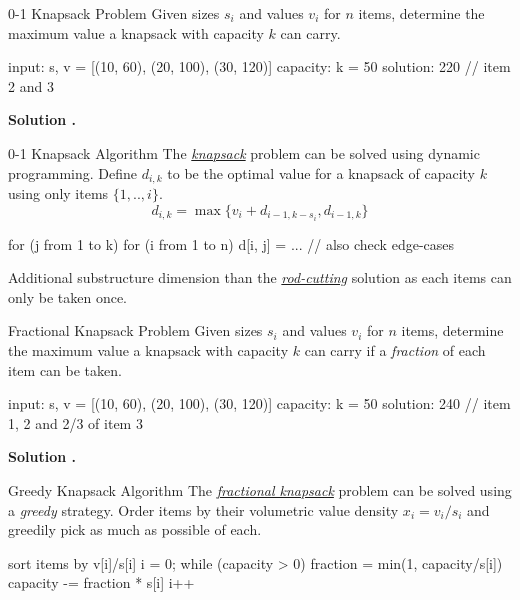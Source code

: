\documentclass{cognito}
\begin{document}
\begin{note}{0-1 Knapsack Problem}
	Given sizes $s_i$ and values $v_i$ for $n$ items, determine the maximum value
	a knapsack with capacity $k$ can carry.
	\begin{largecode}
 input: s, v = [(10, 60), (20, 100), (30, 120)]
 capacity: k = 50
 solution: 220  // item 2 and 3 
	\end{largecode}
	\bf Solution \hyperref[note:0-1 Knapsack Algorithm]{\solutionref}.
\end{note}

\begin{note}{0-1 Knapsack Algorithm}
	The \hyperref[note:0-1 Knapsack Problem]{\it knapsack} problem can be solved using dynamic programming.
	Define $d_{i,k}$ to be the optimal value for a knapsack of capacity $k$ using only items $\{1,..,i\}$.
	$$
		d_{i, k} = \max \{v_i +  d_{i-1, k - s_i}, d_{i-1, k} \}
	$$
	\vspace{-15pt}
	\begin{largecode}
for (j from 1 to k)
	for (i from 1 to n)
		d[i, j] = ...  // also check edge-cases
	\end{largecode}
	\begin{remark} Additional substructure dimension than the \hyperref[note:Rod Cutting Solution]{\it rod-cutting} solution
		as each items can only be taken once.%
	\end{remark} \vspace{-5pt}
\end{note}

\begin{note}{Fractional Knapsack Problem}
	Given sizes $s_i$ and values $v_i$ for $n$ items, determine the maximum value
	a knapsack with capacity $k$ can carry if a \emph{fraction} of each item can be taken.
	\begin{largecode}
 input: s, v = [(10, 60), (20, 100), (30, 120)]
 capacity: k = 50
 solution: 240  // item 1, 2 and 2/3 of item 3
	\end{largecode}
	\bf Solution \hyperref[note:Greedy Knapsack Algorithm]{\solutionref}.
\end{note}

\begin{note}{Greedy Knapsack Algorithm}
	The \hyperref[note:Fractional Knapsack Problem]{\it fractional knapsack} problem can be solved using a \emph{greedy} strategy.
	Order items by their volumetric value density $x_i = v_i/s_i$ and greedily pick as much as possible of each.

	\begin{largecode}
 sort items by v[i]/s[i]
 i = 0; 
 while (capacity > 0)
 	fraction = min(1, capacity/s[i])
	capacity -= fraction * s[i]
	i++
	\end{largecode}
	\vspace{-5pt}
\end{note}
\end{document}
